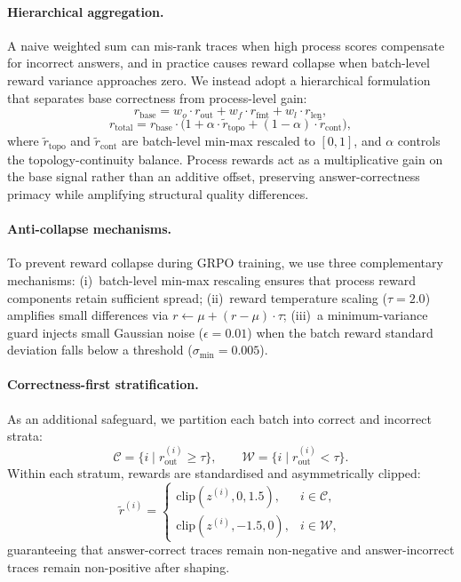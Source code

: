 \paragraph{Hierarchical aggregation.}
A naive weighted sum can mis-rank traces when high process scores compensate for incorrect answers, and in practice causes reward collapse when batch-level reward variance approaches zero.
We instead adopt a hierarchical formulation that separates base correctness from process-level gain:
\begin{equation}
\label{eq:r_base}
r_{\mathrm{base}} = w_o \cdot r_{\mathrm{out}} + w_f \cdot r_{\mathrm{fmt}} + w_l \cdot r_{\mathrm{len}},
\end{equation}
\begin{equation}
\label{eq:r_total}
r_{\mathrm{total}} = r_{\mathrm{base}} \cdot \bigl(1 + \alpha \cdot \tilde{r}_{\mathrm{topo}} + (1-\alpha) \cdot \tilde{r}_{\mathrm{cont}}\bigr),
\end{equation}
where $\tilde{r}_{\mathrm{topo}}$ and $\tilde{r}_{\mathrm{cont}}$ are batch-level min-max rescaled to $[0,1]$, and $\alpha$ controls the topology-continuity balance.
Process rewards act as a multiplicative gain on the base signal rather than an additive offset, preserving answer-correctness primacy while amplifying structural quality differences.

\paragraph{Anti-collapse mechanisms.}
To prevent reward collapse during GRPO training, we use three complementary mechanisms:
(i)~batch-level min-max rescaling ensures that process reward components retain sufficient spread;
(ii)~reward temperature scaling ($\tau{=}2.0$) amplifies small differences via $r \leftarrow \mu + (r - \mu) \cdot \tau$;
(iii)~a minimum-variance guard injects small Gaussian noise ($\epsilon{=}0.01$) when the batch reward standard deviation falls below a threshold ($\sigma_{\min}{=}0.005$).

\paragraph{Correctness-first stratification.}
As an additional safeguard, we partition each batch into correct and incorrect strata:
\begin{equation}
\label{eq:scae_partition}
\mathcal{C}=\{i\mid r_{\mathrm{out}}^{(i)}\ge\tau\},
\qquad
\mathcal{W}=\{i\mid r_{\mathrm{out}}^{(i)}<\tau\}.
\end{equation}
Within each stratum, rewards are standardised and asymmetrically clipped:
\begin{equation}
\label{eq:scae_shape}
\tilde{r}^{(i)}=
\begin{cases}
\mathrm{clip}(z^{(i)},0,1.5), & i\in\mathcal{C},\\
\mathrm{clip}(z^{(i)},-1.5,0), & i\in\mathcal{W},
\end{cases}
\end{equation}
guaranteeing that answer-correct traces remain non-negative and answer-incorrect traces remain non-positive after shaping.

